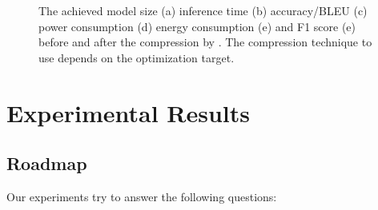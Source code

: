 \begin{figure}[!t]
\centering
{}
\hfill
{}
\hfill
{}
\hfill
{}
\hfill
{}
\hfill

\caption{The achieved model size (a) inference time (b) accuracy/BLEU (c) power consumption (d)
energy consumption (e) and F1 score (e) before and after the compression by \pruning.
The compression technique to use depends on the optimization target.}
\label{fig:analy_prun}
\end{figure}

\section{Experimental Results}


\subsection{Roadmap}
Our experiments try to answer the following questions:

